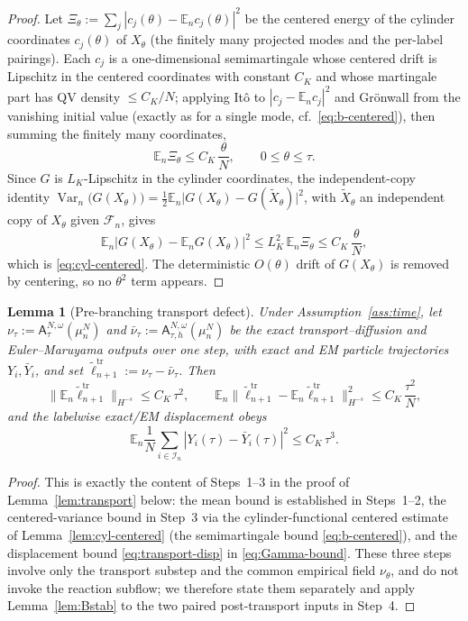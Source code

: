 \documentclass[a4paper,fleqn]{cas-sc}
\newtheorem{lemma}[theorem]{Lemma}
\theoremstyle{definition}
\theoremstyle{remark}
\begin{document}
\begin{proof}
Let $\Xi_\theta:=\sum_j|c_j(\theta)-\mathbb E_nc_j(\theta)|^2$ be the centered energy of
the cylinder coordinates $c_j(\theta)$ of $X_\theta$ (the finitely many projected modes
and the per-label pairings). Each $c_j$ is a one-dimensional semimartingale whose
centered drift is Lipschitz in the centered coordinates with constant $C_K$ and whose
martingale part has QV density $\le C_K/N$; applying It\^o to $|c_j-\mathbb E_nc_j|^2$ and
Gr\"onwall from the vanishing initial value (exactly as for a single mode, cf.\
\eqref{eq:b-centered}), then summing the finitely many coordinates,
\[
\mathbb E_n\Xi_\theta\le C_K\,\frac\theta N,\qquad 0\le\theta\le\tau .
\]
Since $G$ is $L_K$-Lipschitz in the cylinder coordinates, the independent-copy identity
$\operatorname{Var}_n\!\bigl(G(X_\theta)\bigr)
=\tfrac12\mathbb E_n\bigl|G(X_\theta)-G(\widetilde X_\theta)\bigr|^2$, with
$\widetilde X_\theta$ an independent copy of $X_\theta$ given $\mathcal F_n$, gives
\[
\mathbb E_n\bigl|G(X_\theta)-\mathbb E_nG(X_\theta)\bigr|^2
\le L_K^2\,\mathbb E_n\Xi_\theta\le C_K\,\frac\theta N,
\]
which is \eqref{eq:cyl-centered}. The deterministic $O(\theta)$ drift of $G(X_\theta)$ is
removed by centering, so no $\theta^2$ term appears.
\end{proof}

\begin{lemma}[Pre-branching transport defect]\label{lem:transport-pre}
Under Assumption~\ref{ass:time}, let
$\nu_\tau:=\mathsf A^{N,\omega}_\tau(\mu^N_n)$ and
$\bar\nu_\tau:=\mathsf A^{N,\omega}_{\tau,h}(\mu^N_n)$ be the exact transport--diffusion
and Euler--Maruyama outputs over one step, with exact and EM particle trajectories
$Y_i,\bar Y_i$, and set $\widetilde\ell^{\mathrm{tr}}_{n+1}:=\nu_\tau-\bar\nu_\tau$.
Then
\begin{equation}\label{eq:transport-pre}
\|\mathbb E_n\widetilde\ell^{\mathrm{tr}}_{n+1}\|_{H^{-s}}\le C_K\,\tau^2,
\qquad
\mathbb E_n\|\widetilde\ell^{\mathrm{tr}}_{n+1}-\mathbb E_n\widetilde\ell^{\mathrm{tr}}_{n+1}\|_{H^{-s}}^2
\le C_K\,\frac{\tau^2}{N},
\end{equation}
and the labelwise exact/EM displacement obeys
\begin{equation}\label{eq:transport-disp}
\mathbb E_n\frac1N\sum_{i\in\mathcal I_n}|Y_i(\tau)-\bar Y_i(\tau)|^2\le C_K\,\tau^3 .
\end{equation}
\end{lemma}

\begin{proof}
This is exactly the content of Steps~1--3 in the proof of Lemma~\ref{lem:transport}
below: the mean bound is established in Steps~1--2, the centered-variance bound in
Step~3 via the cylinder-functional centered estimate of Lemma~\ref{lem:cyl-centered}
(the semimartingale bound \eqref{eq:b-centered}), and the
displacement bound \eqref{eq:transport-disp} in \eqref{eq:Gamma-bound}. These three
steps involve only the transport substep and the common empirical field $\nu_\theta$,
and do not invoke the reaction subflow; we therefore state them separately and apply
Lemma~\ref{lem:Bstab} to the two paired post-transport inputs in Step~4.
\end{proof}
\end{document}
